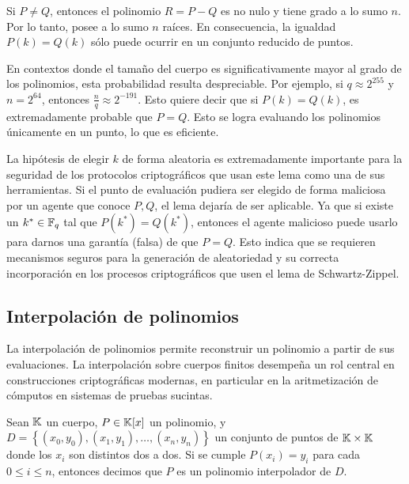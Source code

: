 Si $P \neq Q$, entonces el polinomio $R = P - Q$ es no nulo y tiene grado a lo sumo $n$. Por lo tanto, posee a lo sumo $n$ raíces. En consecuencia, la igualdad $P(k) = Q(k)$ sólo puede ocurrir en un conjunto reducido de puntos.

En contextos donde el tamaño del cuerpo es significativamente mayor al grado de los polinomios, esta probabilidad resulta despreciable. Por ejemplo, si $q \approx 2^{255}$ y $n = 2^{64}$, entonces $\frac{n}{q} \approx 2^{-191}$. Esto quiere decir que si $P(k) = Q(k)$, es extremadamente probable que $P = Q$. Esto se logra evaluando los polinomios únicamente en un punto, lo que es eficiente.

La hipótesis de elegir $k$ de forma aleatoria es extremadamente importante para la seguridad de los protocolos criptográficos que usan este lema como una de sus herramientas. Si el punto de evaluación pudiera ser elegido de forma maliciosa por un agente que conoce $P, Q$, el lema dejaría de ser aplicable. Ya que si existe un $k^* \in \mathbb{F}_q$ tal que $P(k^*) = Q(k^*)$, entonces el agente malicioso puede usarlo para darnos una garantía (falsa) de que $P = Q$. Esto indica que se requieren mecanismos seguros para la generación de aleatoriedad y su correcta incorporación en los procesos criptográficos que usen el lema de Schwartz-Zippel.

\subsection{Interpolación de polinomios}
\label{subsec:apendice-a-polinomios-interpolacion-de-polinomios}

La interpolación de polinomios permite reconstruir un polinomio a partir de sus evaluaciones. La interpolación sobre cuerpos finitos desempeña un rol central en construcciones criptográficas modernas, en particular en la aritmetización de cómputos en sistemas de pruebas sucintas.

\begin{definition}
\label{def:apendice-a-polinomios-polinomio-interpolador}
	Sean $\mathbb{K}$ un cuerpo, $P \in \mathbb{K}[x]$ un polinomio, y $D = \left\{(x_0, y_0), (x_1, y_1), \ldots, (x_n, y_n)\right\}$ un conjunto de puntos de $\mathbb{K} \times \mathbb{K}$ donde los $x_i$ son distintos dos a dos. Si se cumple $P(x_i) = y_i$ para cada $0 \leq i \leq n$, entonces decimos que $P$ es un polinomio interpolador de $D$.
\end{definition}


